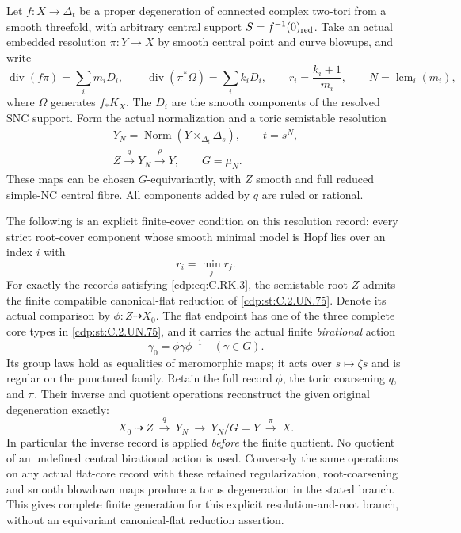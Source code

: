
\begin{proposition}\label{cdp:st:C.2.UN.78}
Let $f:X\to\Delta_t$ be a proper degeneration of connected
complex two-tori from a smooth threefold, with arbitrary
central support $S=f^{-1}(0)_{\rm red}$. Take an actual
embedded resolution $\pi:Y\to X$ by smooth central
point and curve blowups, and write
\[
 \operatorname{div}(f\pi)=\sum_i m_iD_i,
 \qquad \operatorname{div}(\pi^*\Omega)=\sum_i k_iD_i,
 \qquad r_i=\frac{k_i+1}{m_i},
 \qquad N=\operatorname{lcm}_i(m_i),
\tag{C.RK.1}\label{cdp:eq:C.RK.1}
\]
where $\Omega$ generates $f_*K_X$. The $D_i$ are the
smooth components of the resolved SNC support. Form
the actual normalization and a toric semistable
resolution
\[
 \begin{gathered}
 Y_N=\operatorname{Norm}(Y\times_{\Delta_t}\Delta_s),
                \qquad t=s^N,\\
 Z\xrightarrow{\ q\ }Y_N\xrightarrow{\ \rho\ }Y,
                 \qquad G=\mu_N.
 \end{gathered}
\tag{C.RK.2}\label{cdp:eq:C.RK.2}
\]
These maps can be chosen $G$-equivariantly, with $Z$
smooth and full reduced simple-NC central fibre.
All components added by $q$ are ruled or rational.

The following is an explicit finite-cover condition
on this resolution record: every strict root-cover
component whose smooth minimal model is Hopf lies
over an index $i$ with
\[
                            r_i=\min_j r_j.
\tag{C.RK.3}\label{cdp:eq:C.RK.3}
\]
For exactly the records satisfying \eqref{cdp:eq:C.RK.3}, the
semistable root $Z$ admits the finite compatible
canonical-flat reduction of \ref{cdp:st:C.2.UN.75}. Denote its
actual comparison by $\phi:Z\dashrightarrow X_0$.
The flat endpoint has one of the three complete
core types in \ref{cdp:st:C.2.UN.75}, and it carries the actual
finite \emph{birational} action
\[
                 \gamma_0=\phi\gamma\phi^{-1}
                 \quad (\gamma\in G).
\tag{C.RK.4}\label{cdp:eq:C.RK.4}
\]
Its group laws hold as equalities of meromorphic
maps; it acts over $s\mapsto\zeta s$ and is regular
on the punctured family. Retain the full record
$\phi$, the toric coarsening $q$, and $\pi$.
Their inverse and quotient operations reconstruct
the given original degeneration exactly:
\[
 X_0\ \dashrightarrow\ Z\ \xrightarrow{q}\ Y_N
       \ \longrightarrow\ Y_N/G=Y
       \ \xrightarrow{\pi}\ X.
\tag{C.RK.5}\label{cdp:eq:C.RK.5}
\]
In particular the inverse record is applied
\emph{before} the finite quotient. No quotient of
an undefined central birational action is used.
Conversely the same operations on any actual
flat-core record with these retained regularization,
root-coarsening and smooth blowdown maps produce
a torus degeneration in the stated branch.
This gives complete finite generation for this
explicit resolution-and-root branch, without
an equivariant canonical-flat reduction assertion.


\end{proposition}
